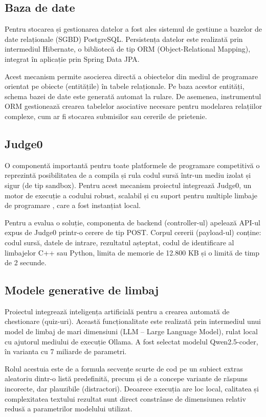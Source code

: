 \subsection{Baza de date}

Pentru stocarea și gestionarea datelor a fost ales sistemul de gestiune a bazelor de date relaționale (SGBD) PostgreSQL. Persistența datelor este realizată prin intermediul Hibernate, o bibliotecă de tip ORM (Object-Relational Mapping), integrat în aplicație prin Spring Data JPA. 

Acest mecanism permite asocierea directă a obiectelor din mediul de programare orientat pe obiecte (entitățile) în tabele relaționale. Pe baza acestor entități, schema bazei de date este generată automat la rulare. De asemenea, instrumentul ORM gestionează crearea tabelelor asociative necesare pentru modelarea relațiilor complexe, cum ar fi stocarea submisilor sau cererile de prietenie.

\subsection{Judge0}

O componentă importantă pentru toate platformele de programare competitivă o reprezintă posibilitatea de a compila și rula codul sursă într-un mediu izolat și sigur (de tip sandbox). Pentru acest mecanism proiectul integrează Judge0, un motor de execuție a codului robust, scalabil și cu suport pentru multiple limbaje de programare \cite{dosilovic2020}, care a fost instanțiat local.  

Pentru a evalua o soluție, componenta de backend (controller-ul) apelează API-ul expus de Judge0 printr-o cerere de tip POST. Corpul cererii (payload-ul) conține: codul sursă, datele de intrare, rezultatul așteptat, codul de identificare al limbajelor C++ sau Python, limita de memorie de 12.800 KB și o limită de timp de 2 secunde.

\subsection{Modele generative de limbaj}

Proiectul integrează inteligența artificială pentru a crearea automată de chestionare (quiz-uri). Această funcționalitate este realizată prin intermediul unui model de limbaj de mari dimensiuni (LLM – Large Language Model), rulat local cu ajutorul mediului de execuție Ollama. A fost selectat modelul Qwen2.5-coder, în varianta cu 7 miliarde de parametri. 

Rolul acestuia este de a formula secvențe scurte de cod pe un subiect extras aleatoriu dintr-o listă predefinită, precum și de a concepe variante de răspuns incorecte, dar plauzibile (distractori). Deoarece execuția are loc local, calitatea și complexitatea textului rezultat sunt direct constrânse de dimensiunea relativ redusă a parametrilor modelului utilizat.

